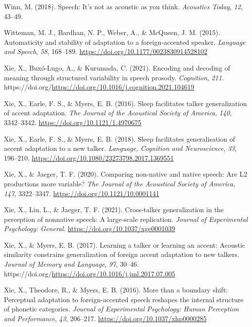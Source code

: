 \documentclass[
  11pt,
  english,
  man,floatsintext]{apa6}
\newlength{\cslhangindent}
\newlength{\cslentryspacingunit} %
\newenvironment{CSLReferences}[2] %
 {%
  \setlength{\parindent}{0pt}
  \ifodd #1
  \let\oldpar\par
  \def\par{\hangindent=\cslhangindent\oldpar}
  \fi
  \setlength{\parskip}{#2\cslentryspacingunit}
 }%
 {}
\begin{document}
\begin{CSLReferences}{1}{0}
\leavevmode{}%
Winn, M. (2018). Speech: It's not as acoustic as you think. \emph{Acoustics Today}, \emph{12}, 43--49.

\leavevmode{}%
Witteman, M. J., Bardhan, N. P., Weber, A., \& McQueen, J. M. (2015). Automaticity and stability of adaptation to a foreign-accented speaker. \emph{Language and Speech}, \emph{58}, 168--189. \url{https://doi.org/10.1177/0023830914528102}

\leavevmode{}%
Xie, X., Buxó-Lugo, A., \& Kurumada, C. (2021). Encoding and decoding of meaning through structured variability in speech prosody. \emph{Cognition}, \emph{211}. https://doi.org/\url{https://doi.org/10.1016/j.cognition.2021.104619}

\leavevmode{}%
Xie, X., Earle, F. S., \& Myers, E. B. (2016). Sleep facilitates talker generalization of accent adaptation. \emph{The Journal of the Acoustical Society of America}, \emph{140}, 3342--3342. \url{https://doi.org/10.1121/1.4970675}

\leavevmode{}%
Xie, X., Earle, F. S., \& Myers, E. B. (2018). Sleep facilitates generalisation of accent adaptation to a new talker. \emph{Language, Cognition and Neuroscience}, \emph{33}, 196--210. \url{https://doi.org/10.1080/23273798.2017.1369551}

\leavevmode{}%
Xie, X., \& Jaeger, T. F. (2020). Comparing non-native and native speech: Are L2 productions more variable? \emph{The Journal of the Acoustical Society of America}, \emph{147}, 3322--3347. \url{https://doi.org/10.1121/10.0001141}

\leavevmode{}%
Xie, X., Liu, L., \& Jaeger, T. F. (2021). Cross-talker generalization in the perception of nonnative speech: A large-scale replication. \emph{Journal of Experimental Psychology: General}. \url{https://doi.org/10.1037/xge0001039}

\leavevmode{}%
Xie, X., \& Myers, E. B. (2017). Learning a talker or learning an accent: Acoustic similarity constrains generalization of foreign accent adaptation to new talkers. \emph{Journal of Memory and Language}, \emph{97}, 30--46. https://doi.org/\url{https://doi.org/10.1016/j.jml.2017.07.005}

\leavevmode{}%
Xie, X., Theodore, R., \& Myers, E. B. (2016). More than a boundary shift: Perceptual adaptation to foreign-accented speech reshapes the internal structure of phonetic categories. \emph{Journal of Experimental Psychology: Human Perception and Performance}, \emph{43}, 206--217. \url{https://doi.org/10.1037/xhp0000285}


\end{CSLReferences}
\end{document}
